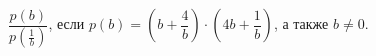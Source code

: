 \begin{ex}[type=calculate_expression]
	\begin{condition}
		\( \dfrac{p(b)}{p\left( \frac{1}{b} \right)} \), если \( p(b)=\left( b+\dfrac{4}{b} \right)\cdot\left( 4b+\dfrac{1}{b} \right) \), а также \( b\neq0 \).
	\end{condition}
\end{ex}